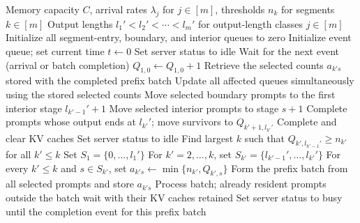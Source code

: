 \begin{algorithm}[h]
\caption{Nested WAIT: Nested Waiting for Accumulated Inference Threshold}
\label{alg:nested_wait}
{\small\linespread{1.0}\selectfont
\begin{algorithmic}[1]
\Require Memory capacity \( C \), arrival rates \( \lambda_j \) for \( j \in [m] \), thresholds \( n_k \) for segments \( k \in [m] \)
\Require Output lengths \( l_1' < l_2' < \cdots < l_m' \) for output-length classes \( j \in [m] \)
    \Statex {}
    \Statex {}
    \State Initialize all segment-entry, boundary, and interior queues to zero
\State Initialize event queue; set current time \( t \gets 0 \)
\State Set server status to idle
    \State Wait for the next event (arrival or batch completion)
        \State \( Q_{1,0} \gets Q_{1,0} + 1 \)  
        \State Retrieve the selected counts \(a_{k's}\) stored with the completed prefix batch
        \State Update all affected queues simultaneously using the stored selected counts
                \State Move selected boundary prompts to the first interior stage \(l_{k'-1}'+1\)
                \State Move selected interior prompts to stage \(s+1\)
            \Else
                    \State Complete prompts whose output ends at \(l_{k'}'\); move survivors to \(Q_{k'+1,l_{k'}'}\)
                \Else
                    \State Complete and clear KV caches
                \EndIf
            \EndIf
        \EndFor
        \EndFor
        \State Set server status to idle
    \EndIf
    \State Find largest \( k \) such that \( Q_{k', l_{k'-1}'} \geq n_{k'} \) for all \( k' \leq k \) 
        \State Set \(S_1=\{0,\ldots,l_1'\}\)
        \State For \(k'=2,\ldots,k\), set \(S_{k'}=\{l_{k'-1}',\ldots,l_{k'}'\}\)
        \State For every \(k'\le k\) and \(s\in S_{k'}\), set \(a_{k's}\gets\min\{n_{k'},Q_{k',s}\}\)
        \State Form the prefix batch from all selected prompts and store \(a_{k's}\)
        \State Process batch; already resident prompts outside the batch wait with their KV caches retained
        \State Set server status to busy until the completion event for this prefix batch
    \EndIf
\EndWhile
\end{algorithmic}
}
\end{algorithm}

